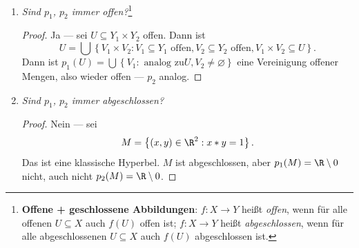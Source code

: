 \begin{problem}[2]
\begin{enumerate}
    \item \emph{Sind \( p_1 \), \( p_2 \) immer offen?}\footnote{\textbf{Offene + geschlossene Abbildungen}: \( f: X \to Y \) heißt \emph{offen}, wenn für alle offenen \( U \subseteq X \) auch \( f(U) \) offen ist; \( f: X \to Y \) heißt \emph{abgeschlossen}, wenn für alle abgeschlossenen \( U \subseteq X \) auch \( f(U) \) abgeschlossen ist.}
    
    \begin{proof}
      Ja --- sei \( U \subseteq Y_1 \times Y_2 \) offen. Dann ist
      \begin{equation*}
        U = \bigcup\left \{ V_1 \times V_2 : V_1 \subseteq Y_1 \text{ offen}, V_2 \subseteq Y_2 \text{ offen}, V_1 \times V_2 \subseteq U \right \} \text{.}
      \end{equation*}
      Dann ist \( p_1(U) = \bigcup\left \{ V_1 : \text{ analog zu} U, V_2 \neq \varnothing \right \} \) eine Vereinigung offener Mengen, also wieder offen --- \( p_2 \) analog.
    \end{proof}
    
    \item \emph{Sind \( p_1 \), \( p_2 \) immer abgeschlossen?}
    
    \begin{proof}
      Nein --- sei
      \begin{equation*}
        M = \left \{ (x,y) \in \R^2 : x*y = 1 \right \} \text{.}
      \end{equation*}
      Das ist eine klassische Hyperbel. \( M \) ist abgeschlossen, aber \( p_1(M) = \R \setminus { 0} \) nicht, auch nicht \( p_2(M) = \R \setminus { 0} \).
    \end{proof}
  \end{enumerate}
\end{problem}

